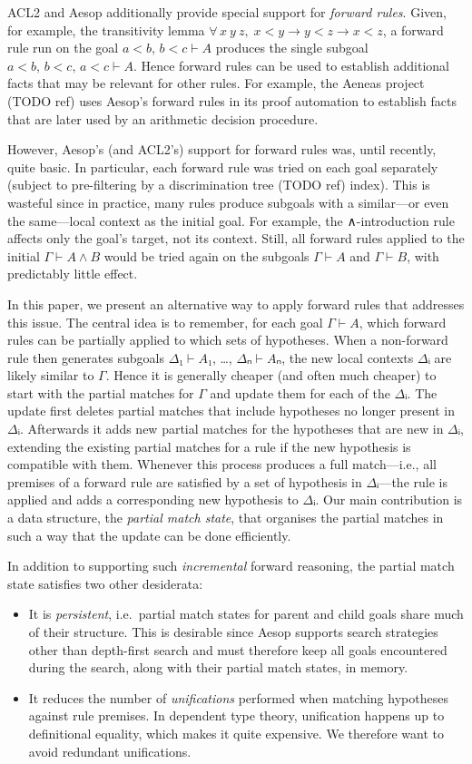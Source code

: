 \documentclass[runningheads]{llncs}
\newcommand{\jcom}[1]{{\color{orange}{Jannis: #1}} }
\newcommand{\All}[2]{\ensuremath{\forall\, #1,\; #2}}
\begin{document}
ACL2 and Aesop additionally provide special support for \emph{forward rules}.
Given, for example, the transitivity lemma $\All{x~y~z}{x < y → y < z → x < z}$, a forward rule run on the goal $a < b,\, b < c ⊢ A$ produces the single subgoal $a < b,\, b < c,\, a < c ⊢ A$.
Hence forward rules can be used to establish additional facts that may be relevant for other rules.
For example, the Aeneas project (TODO ref) uses Aesop's forward rules \jcom{(ensure that this is accurate)} in its proof automation to establish facts that are later used by an arithmetic decision procedure.

However, Aesop's (and ACL2's) support for forward rules was, until recently, quite basic.
In particular, each forward rule was tried on each goal separately (subject to pre-filtering by a discrimination tree (TODO ref) index).
This is wasteful since in practice, many rules produce subgoals with a similar---or even the same---local context as the initial goal.
For example, the ∧-introduction rule affects only the goal's target, not its context.
Still, all forward rules applied to the initial $Γ ⊢ A ∧ B$ would be tried again on the subgoals $Γ ⊢ A$ and $Γ ⊢ B$, with predictably little effect.

In this paper, we present an alternative way to apply forward rules that addresses this issue.
The central idea is to remember, for each goal $Γ ⊢ A$, which forward rules can be partially applied to which sets of hypotheses.
When a non-forward rule then generates subgoals $Δ₁ ⊢ A₁$, \dots, $Δₙ ⊢ Aₙ$, the new local contexts $Δᵢ$ are likely similar to $Γ$.
Hence it is generally cheaper (and often much cheaper) to start with the partial matches for $Γ$ and update them for each of the $Δᵢ$.
The update first deletes partial matches that include hypotheses no longer present in $Δᵢ$.
Afterwards it adds new partial matches for the hypotheses that are new in $Δᵢ$, extending the existing partial matches for a rule if the new hypothesis is compatible with them.
Whenever this process produces a full match---i.e., all premises of a forward rule are satisfied by a set of hypothesis in $Δᵢ$---the rule is applied and adds a corresponding new hypothesis to $Δᵢ$.
Our main contribution is a data structure, the \emph{partial match state}, that organises the partial matches in such a way that the update can be done efficiently.

In addition to supporting such \emph{incremental} forward reasoning, the partial match state satisfies two other desiderata:
\begin{itemize}
  \item It is \emph{persistent}, i.e.\ partial match states for parent and child goals share much of their structure.
        This is desirable since Aesop supports search strategies other than depth-first search and must therefore keep all goals encountered during the search, along with their partial match states, in memory.
  \item It reduces the number of \emph{unifications} performed when matching hypotheses against rule premises.
        In dependent type theory, unification happens up to definitional equality, which makes it quite expensive.
        We therefore want to avoid redundant unifications.
\end{itemize}
\end{document}
